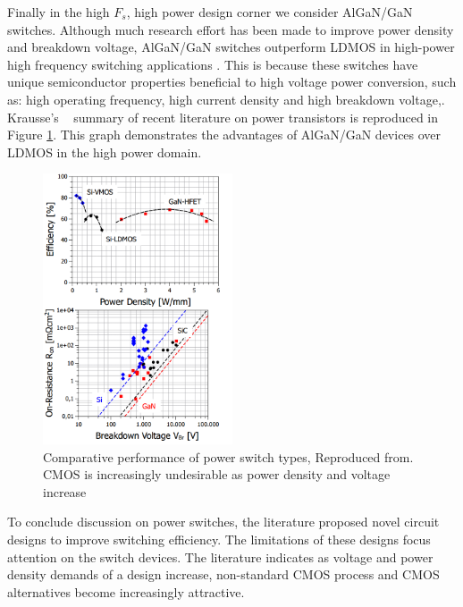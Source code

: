 \documentclass[letterpaper,twocolumn,10pt]{article}
\begin{document}
\indent Finally in the high $F_s$, high power design corner we consider AlGaN/GaN switches. Although much research effort has been made to improve power density and breakdown voltage, AlGaN/GaN switches outperform LDMOS in high-power high frequency switching applications \cite{Goyal2013}. This is because these switches have unique semiconductor properties beneficial to high voltage power conversion, such as: high operating frequency, high current density and high breakdown voltage\cite{Alamo2009},\cite{Mustapha2008}. Krausse's ~\cite{Krausse2013} summary of recent literature on power transistors is reproduced in Figure \ref{GaNCharacter}. This graph demonstrates the advantages of AlGaN/GaN devices over LDMOS in the high power domain.\\ %
\begin{figure}[here]
\includegraphics[width=0.5\textwidth]{TransistorPerf}
\caption{Comparative performance of power switch types, Reproduced from\cite{Krausse2013}. CMOS is increasingly undesirable as power density and voltage increase}
\label{GaNCharacter}
\end{figure}


\indent To conclude discussion on power switches, the literature proposed novel circuit designs to improve switching efficiency. The limitations of these designs focus attention on the switch devices. The literature indicates as voltage and power density demands of a design increase, non-standard CMOS process and CMOS alternatives become increasingly attractive.\\
\end{document}
